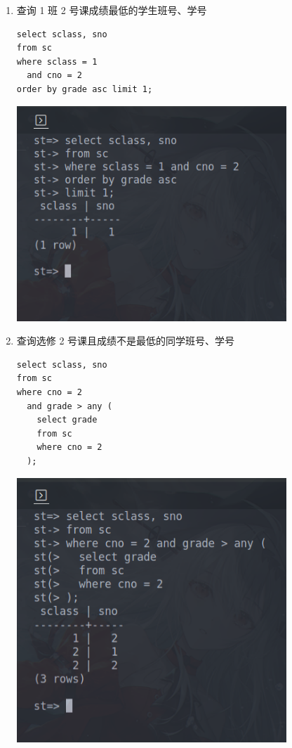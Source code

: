 \documentclass[hyperref,UTF8,12pt,a4paper]{ctexart}
\begin{document}
\begin{enumerate}
\item 查询 1 班 2 号课成绩最低的学生班号、学号 

\begin{verbatim}
select sclass, sno
from sc
where sclass = 1
  and cno = 2
order by grade asc limit 1;
\end{verbatim}

\begin{center}
\includegraphics[width=0.8\textwidth]{19.png}
\end{center}

\item 查询选修 2 号课且成绩不是最低的同学班号、学号

\begin{verbatim}
select sclass, sno
from sc
where cno = 2
  and grade > any (
    select grade
    from sc
    where cno = 2
  );
\end{verbatim}

\begin{center}
\includegraphics[width=0.8\textwidth]{20.png}
\end{center}


\end{enumerate}
\end{document}
